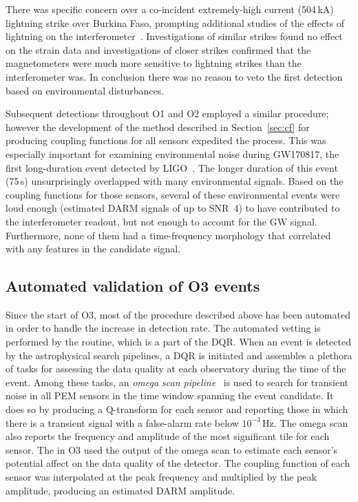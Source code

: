 There was specific concern over a co-incident extremely-high current (504\,kA) lightning strike over Burkina Faso, prompting additional studies of the effects of lightning on the interferometer~\citep{Schofield_lightning}.
Investigations of similar strikes found no effect on the strain data and investigations of closer strikes confirmed that the magnetometers were much more sensitive to lightning strikes than the interferometer was.
In conclusion there was no reason to veto the first detection based on environmental disturbances.

Subsequent detections throughout \ac{O1} and \ac{O2} employed a similar procedure; however the development of the method described in Section~\ref{sec:cf} for producing coupling functions for all sensors expedited the process.
This was especially important for examining environmental noise during GW170817, the first long-duration event detected by \ac{LIGO}~\citep{gw170817, Schofield_170817}.
The longer duration of this event (75\,s) unsurprisingly overlapped with many environmental signals.
Based on the coupling functions for those sensors, several of these environmental events were loud enough (estimated \ac{DARM} signals of up to \ac{SNR}~4) to have contributed to the interferometer readout, but not enough to account for the \ac{GW} signal.
Furthermore, none of them had a time-frequency morphology that correlated with any features in the candidate signal.


\subsection{Automated validation of O3 events}

Since the start of \ac{O3}, most of the procedure described above has been automated in order to handle the increase in detection rate.
The automated vetting is performed by the  routine, which is a part of the \ac{DQR}.
When an event is detected by the astrophysical search pipelines, a \ac{DQR} is initiated and assembles a plethora of tasks for assessing the data quality at each observatory during the time of the event.
Among these tasks, an \textit{omega scan pipeline}~\citep{Davis_2021, Chatterji_2004} is used to search for transient noise in all \ac{PEM} sensors in the time window spanning the event candidate.
It does so by producing a Q-transform for each sensor and reporting those in which there is a transient signal with a false-alarm rate below $10^{-3}$\,Hz.
The omega scan also reports the frequency and amplitude of the most significant tile for each sensor.
The  in \ac{O3} used the output of the omega scan to estimate each sensor's potential affect on the data quality of the detector.
The coupling function of each sensor was interpolated at the peak frequency and multiplied by the peak amplitude, producing an estimated \ac{DARM} amplitude.

